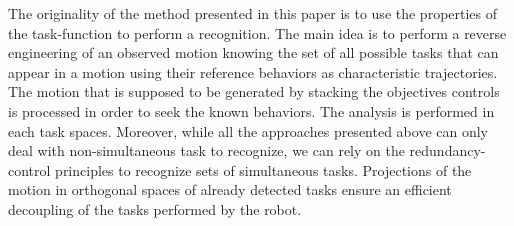\documentclass[letterpaper, 10pt, conference]{ieeeconf}      %
\begin{document}

The originality of the method presented in this paper is to use the properties of the
task-function to perform a recognition. The main idea is
to perform a reverse engineering of an observed motion knowing the set of all possible tasks that can appear 
in a motion using their reference behaviors as characteristic trajectories. 
The motion that is supposed to be generated by stacking the objectives controls is processed in order to
seek the known behaviors. The analysis is performed in each task spaces. 
Moreover, while all the approaches presented above can only deal with non-simultaneous task to recognize,
we can rely on the redundancy-control principles to recognize sets of simultaneous tasks.
Projections of the motion in orthogonal spaces of already detected tasks
ensure an efficient decoupling of the tasks performed
by the robot.
%
\end{document}
